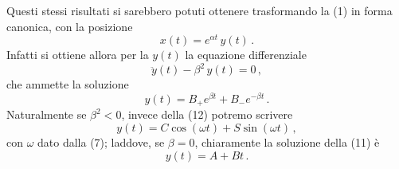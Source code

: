 \documentclass[11pt, a4paper]{book}
\numberwithin{equation}{section}
\begin{document}
Questi stessi risultati si sarebbero potuti ottenere trasformando la (1) in
forma canonica, con la posizione
\begin{equation}
    x(t) = e^{\alpha t} \, y(t) \,.
\end{equation}
Infatti si ottiene allora per la $y(t)$ la equazione differenziale
\begin{equation}
    \ddot{y}(t) - \beta^2 \, y(t) = 0 \,,
\end{equation}
che ammette la soluzione
\begin{equation}
    y(t) = B_+ e^{\beta t} + B_- e^{-\beta t} \,. \tag{12}
\end{equation}
Naturalmente se $\beta^2 < 0$, invece della (12) potremo scrivere
\begin{equation}
    y(t) = C \cos(\omega t) + S \sin(\omega t) \,, \tag{13}
\end{equation}
con $\omega$ dato dalla (7); laddove, se $\beta = 0$, chiaramente la soluzione della (11) è
\begin{equation}
    y(t) = A + B t \,. \tag{14}
\end{equation}
\end{document}
